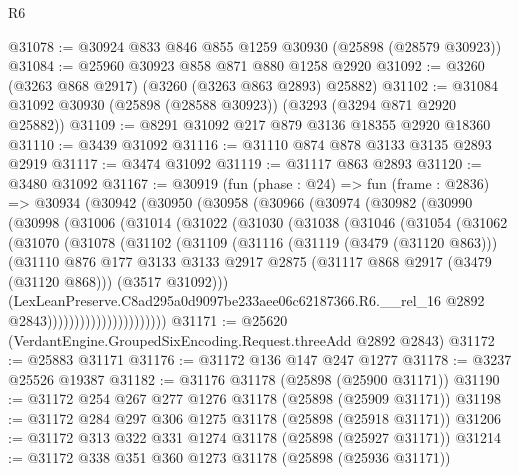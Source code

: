 \begin{lexlean}{R6}
\begin{coremodule}
@31078 := @30924 @833 @846 @855 @1259 @30930 (@25898 (@28579 @30923))
@31084 := @25960 @30923 @858 @871 @880 @1258 @2920
@31092 := @3260 (@3263 @868 @2917) (@3260 (@3263 @863 @2893) @25882)
@31102 := @31084 @31092 @30930 (@25898 (@28588 @30923)) (@3293 (@3294 @871 @2920 @25882))
@31109 := @8291 @31092 @217 @879 @3136 @18355 @2920 @18360
@31110 := @3439 @31092
@31116 := @31110 @874 @878 @3133 @3135 @2893 @2919
@31117 := @3474 @31092
@31119 := @31117 @863 @2893
@31120 := @3480 @31092
@31167 := @30919
    (fun (phase : @24) =>
    fun (frame : @2836) =>
    @30934
      (@30942
        (@30950
          (@30958
            (@30966
              (@30974
                (@30982
                  (@30990
                    (@30998
                      (@31006
                        (@31014
                          (@31022
                            (@31030
                              (@31038
                                (@31046
                                  (@31054
                                    (@31062
                                      (@31070
                                        (@31078
                                          (@31102
                                            (@31109
                                              (@31116
                                                (@31119 (@3479 (@31120 @863)))
                                                (@31110
                                                  @876
                                                  @177
                                                  @3133
                                                  @3133
                                                  @2917
                                                  @2875
                                                  (@31117 @868 @2917 (@3479 (@31120 @868)))
                                                  (@3517 @31092)))
                                              (LexLeanPreserve.C8ad295a0d9097be233aee06c62187366.R6.__rel_16
                                                @2892
                                                @2843))))))))))))))))))))))
@31171 := @25620 (VerdantEngine.GroupedSixEncoding.Request.threeAdd @2892 @2843)
@31172 := @25883 @31171
@31176 := @31172 @136 @147 @247 @1277
@31178 := @3237 @25526 @19387
@31182 := @31176 @31178 (@25898 (@25900 @31171))
@31190 := @31172 @254 @267 @277 @1276 @31178 (@25898 (@25909 @31171))
@31198 := @31172 @284 @297 @306 @1275 @31178 (@25898 (@25918 @31171))
@31206 := @31172 @313 @322 @331 @1274 @31178 (@25898 (@25927 @31171))
@31214 := @31172 @338 @351 @360 @1273 @31178 (@25898 (@25936 @31171))

\end{coremodule}
\end{lexlean}
